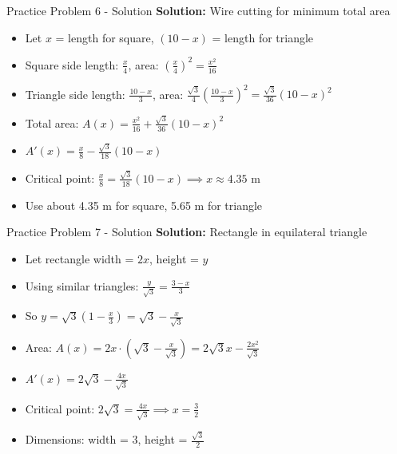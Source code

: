 \documentclass[aspectratio=169]{beamer}
\begin{document}
\begin{frame}{Practice Problem 6 - Solution}
\textbf{Solution:} Wire cutting for minimum total area

\begin{itemize}
    \item Let $x$ = length for square, $(10-x)$ = length for triangle
    \item Square side length: $\frac{x}{4}$, area: $(\frac{x}{4})^2 = \frac{x^2}{16}$
    \item Triangle side length: $\frac{10-x}{3}$, area: $\frac{\sqrt{3}}{4}(\frac{10-x}{3})^2 = \frac{\sqrt{3}}{36}(10-x)^2$
    \item Total area: $A(x) = \frac{x^2}{16} + \frac{\sqrt{3}}{36}(10-x)^2$
    \item $A'(x) = \frac{x}{8} - \frac{\sqrt{3}}{18}(10-x)$
    \item Critical point: $\frac{x}{8} = \frac{\sqrt{3}}{18}(10-x) \implies x \approx 4.35$ m
    \item Use about 4.35 m for square, 5.65 m for triangle
\end{itemize}
\end{frame}

\begin{frame}{Practice Problem 7 - Solution}
\textbf{Solution:} Rectangle in equilateral triangle

\begin{itemize}
    \item Let rectangle width = $2x$, height = $y$
    \item Using similar triangles: $\frac{y}{\sqrt{3}} = \frac{3-x}{3}$
    \item So $y = \sqrt{3}(1-\frac{x}{3}) = \sqrt{3} - \frac{x}{\sqrt{3}}$
    \item Area: $A(x) = 2x \cdot (\sqrt{3} - \frac{x}{\sqrt{3}}) = 2\sqrt{3}x - \frac{2x^2}{\sqrt{3}}$
    \item $A'(x) = 2\sqrt{3} - \frac{4x}{\sqrt{3}}$
    \item Critical point: $2\sqrt{3} = \frac{4x}{\sqrt{3}} \implies x = \frac{3}{2}$
    \item Dimensions: width = $3$, height = $\frac{\sqrt{3}}{2}$
\end{itemize}
\end{frame}
\end{document}
